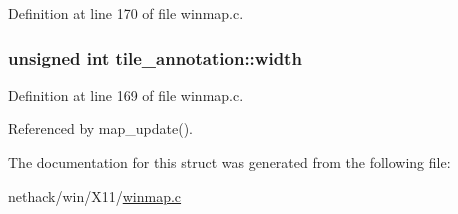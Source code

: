 Definition at line 170 of file winmap.\+c.

\hypertarget{structtile__annotation_abebdada9a87e5e8252ad6213f48aee66}{
\subsubsection[{width}]{\setlength{\rightskip}{0pt plus 5cm}unsigned int tile\+\_\+annotation\+::width}}\label{structtile__annotation_abebdada9a87e5e8252ad6213f48aee66}


Definition at line 169 of file winmap.\+c.



Referenced by map\+\_\+update().



The documentation for this struct was generated from the following file\+:\begin{DoxyCompactItemize}
\item 
nethack/win/\+X11/\hyperlink{winmap_8c}{winmap.\+c}\end{DoxyCompactItemize}
